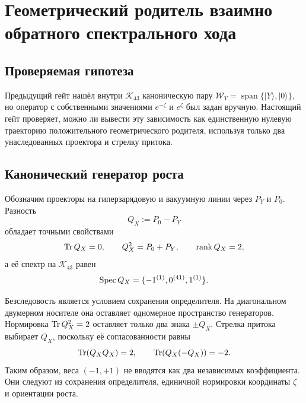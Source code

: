 \chapter{Геометрический родитель взаимно обратного спектрального хода}
\label{ch:v10-k43-reciprocal-spectral-operator-growth-parent-origin}

\section{Проверяемая гипотеза}

Предыдущий гейт нашёл внутри $\mathcal K_{43}$ каноническую пару
$\mathcal W_Y=\operatorname{span}\{|Y\rangle,|0\rangle\}$, но оператор с
собственными значениями $e^{-\zeta}$ и $e^{\zeta}$ был задан вручную.
Настоящий гейт проверяет, можно ли вывести эту зависимость как единственную
нулевую траекторию положительного геометрического родителя, используя только
два унаследованных проектора и стрелку притока.

\section{Канонический генератор роста}

Обозначим проекторы на гиперзарядовую и вакуумную линии через $P_Y$ и $P_0$.
Разность
\begin{equation}
 Q_X:=P_0-P_Y
 \label{eq:v10-growth-grading}
\end{equation}
обладает точными свойствами
\begin{equation}
 \operatorname{Tr} Q_X=0,
 \qquad Q_X^2=P_0+P_Y,
 \qquad \operatorname{rank} Q_X=2,
 \label{eq:v10-growth-grading-identities}
\end{equation}
а её спектр на $\mathcal K_{43}$ равен
\begin{equation}
 \operatorname{Spec} Q_X=\{-1^{(1)},0^{(41)},1^{(1)}\}.
 \label{eq:v10-growth-grading-spectrum}
\end{equation}

Безследовость является условием сохранения определителя. На диагональном
двумерном носителе она оставляет одномерное пространство генераторов.
Нормировка $\operatorname{Tr} Q_X^2=2$ оставляет только два знака $\pm Q_X$. Стрелка
притока выбирает $Q_X$, поскольку её согласованности равны
\begin{equation}
 \operatorname{Tr}(Q_XQ_X)=2,
 \qquad
 \operatorname{Tr}(Q_X(-Q_X))=-2.
 \label{eq:v10-growth-arrow-sign-selection}
\end{equation}
Таким образом, веса $(-1,+1)$ не вводятся как два независимых коэффициента.
Они следуют из сохранения определителя, единичной нормировки координаты
$\zeta$ и ориентации роста.

